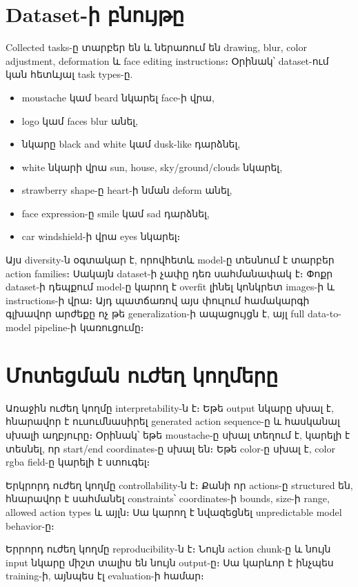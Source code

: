 \documentclass[12pt,a4paper]{report}
\begin{document}
\section{Dataset-ի բնույթը}

Collected tasks-ը տարբեր են և ներառում են drawing, blur, color adjustment, deformation և face editing instructions։ Օրինակ՝ dataset-ում կան հետևյալ task types-ը.
\begin{itemize}
    \item moustache կամ beard նկարել face-ի վրա,
    \item logo կամ faces blur անել,
    \item նկարը black and white կամ dusk-like դարձնել,
    \item white նկարի վրա sun, house, sky/ground/clouds նկարել,
    \item strawberry shape-ը heart-ի նման deform անել,
    \item face expression-ը smile կամ sad դարձնել,
    \item car windshield-ի վրա eyes նկարել։
\end{itemize}

Այս diversity-ն օգտակար է, որովհետև model-ը տեսնում է տարբեր action families։ Սակայն dataset-ի չափը դեռ սահմանափակ է։ Փոքր dataset-ի դեպքում model-ը կարող է overfit լինել կոնկրետ images-ի և instructions-ի վրա։ Այդ պատճառով այս փուլում համակարգի գլխավոր արժեքը ոչ թե generalization-ի ապացույցն է, այլ full data-to-model pipeline-ի կառուցումը։

\section{Մոտեցման ուժեղ կողմերը}

Առաջին ուժեղ կողմը interpretability-ն է։ Եթե output նկարը սխալ է, հնարավոր է ուսումնասիրել generated action sequence-ը և հասկանալ սխալի աղբյուրը։ Օրինակ՝ եթե moustache-ը սխալ տեղում է, կարելի է տեսնել, որ start/end coordinates-ը սխալ են։ Եթե color-ը սխալ է, color rgba field-ը կարելի է ստուգել։

Երկրորդ ուժեղ կողմը controllability-ն է։ Քանի որ actions-ը structured են, հնարավոր է սահմանել constraints՝ coordinates-ի bounds, size-ի range, allowed action types և այլն։ Սա կարող է նվազեցնել unpredictable model behavior-ը։

Երրորդ ուժեղ կողմը reproducibility-ն է։ Նույն action chunk-ը և նույն input նկարը միշտ տալիս են նույն output-ը։ Սա կարևոր է ինչպես training-ի, այնպես էլ evaluation-ի համար։
\end{document}
